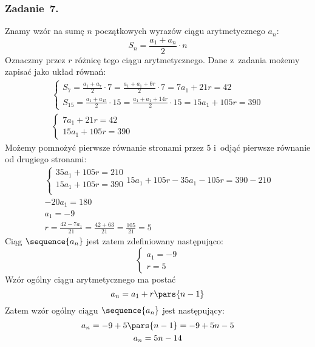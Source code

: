 \subsubsection*{Zadanie~7.}
Znamy wzór na sumę \(n\) początkowych wyrazów ciągu arytmetycznego \(a_n\):
\begin{equation*}
    S_n = \frac{a_1 + a_n}{2} \cdot n
\end{equation*}
Oznaczmy przez \(r\) różnicę tego ciągu arytmetycznego. Dane z~zadania możemy zapisać jako układ równań:
\begin{gather*}
    \begin{cases}
        S_7 = \frac{a_1 + a_7}{2} \cdot 7 = \frac{a_1 + a_1 + 6r}{2} \cdot 7 = 7a_1 + 21r = 42\\
        S_15 = \frac{a_1 + a_{15}}{2} \cdot 15 = \frac{a_1 + a_1 + 14r}{2} \cdot 15 = 15a_1 + 105r = 390
    \end{cases}\\
    \begin{cases}
        7a_1 + 21r = 42\\
        15a_1 + 105r = 390
    \end{cases}
\end{gather*}
Możemy pomnożyć pierwsze równanie stronami przez \(5\) i~odjąć pierwsze równanie od drugiego stronami:
\begin{gather*}
    \begin{cases}
        35a_1 + 105r = 210\\
        15a_1 + 105r = 390\\
    \end{cases}
    15a_1 + 105r - 35a_1 - 105r = 390 - 210\\
    -20a_1 = 180\\
    a_1 = -9\\
    r = \frac{42 - 7a_1}{21}
        = \frac{42 + 63}{21}
        = \frac{105}{21}
        = 5
\end{gather*}
Ciąg \(\sequence{a_n}\) jest zatem zdefiniowany następująco:
\begin{equation*}
    \begin{cases}
        a_1 = -9\\
        r = 5
    \end{cases}
\end{equation*}
Wzór ogólny ciągu arytmetycznego ma postać
\begin{equation*}
    a_n = a_1 + r\pars{n - 1}
\end{equation*}
Zatem wzór ogólny ciągu \(\sequence{a_n}\) jest następujący:
\begin{gather*}
    a_n = -9 + 5\pars{n - 1} = -9 + 5n - 5\\
    a_n = 5n - 14
\end{gather*}
